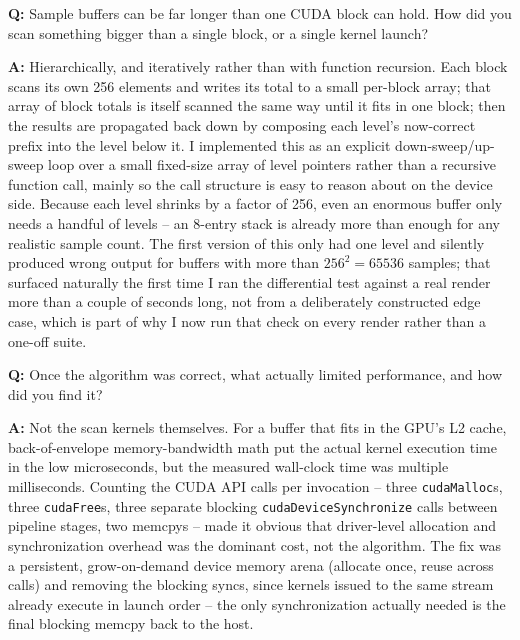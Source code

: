 \documentclass[11pt]{article}
\newcommand{\Q}[1]{\vspace{0.6em}\noindent\textbf{\textcolor{blue!60!black}{Q:}} #1\par}
\newcommand{\A}[1]{\noindent\textbf{A:} #1\par}
\begin{document}
\Q{Sample buffers can be far longer than one CUDA block can hold. How did you scan something bigger than a single block, or a single kernel launch?}
\A{Hierarchically, and iteratively rather than with function recursion. Each block scans its own 256 elements and writes its total to a small per-block array; that array of block totals is itself scanned the same way until it fits in one block; then the results are propagated back down by composing each level's now-correct prefix into the level below it. I implemented this as an explicit down-sweep/up-sweep loop over a small fixed-size array of level pointers rather than a recursive function call, mainly so the call structure is easy to reason about on the device side. Because each level shrinks by a factor of 256, even an enormous buffer only needs a handful of levels -- an 8-entry stack is already more than enough for any realistic sample count. The first version of this only had one level and silently produced wrong output for buffers with more than $256^2=65536$ samples; that surfaced naturally the first time I ran the differential test against a real render more than a couple of seconds long, not from a deliberately constructed edge case, which is part of why I now run that check on every render rather than a one-off suite.}

\Q{Once the algorithm was correct, what actually limited performance, and how did you find it?}
\A{Not the scan kernels themselves. For a buffer that fits in the GPU's L2 cache, back-of-envelope memory-bandwidth math put the actual kernel execution time in the low microseconds, but the measured wall-clock time was multiple milliseconds. Counting the CUDA API calls per invocation -- three \texttt{cudaMalloc}s, three \texttt{cudaFree}s, three separate blocking \texttt{cudaDeviceSynchronize} calls between pipeline stages, two memcpys -- made it obvious that driver-level allocation and synchronization overhead was the dominant cost, not the algorithm. The fix was a persistent, grow-on-demand device memory arena (allocate once, reuse across calls) and removing the blocking syncs, since kernels issued to the same stream already execute in launch order -- the only synchronization actually needed is the final blocking memcpy back to the host.}
\end{document}

